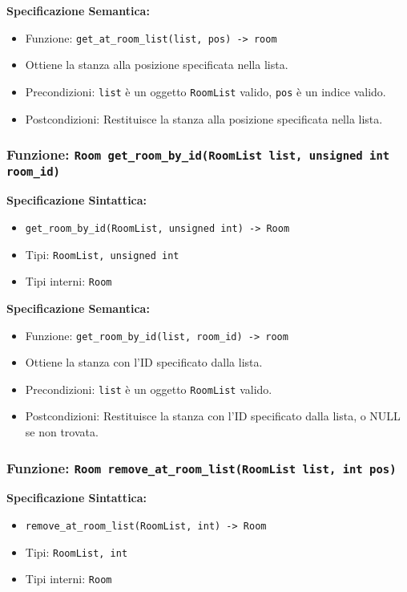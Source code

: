 \documentclass[11pt]{scrartcl} %
\begin{document}
\textbf{Specificazione Semantica:}
\begin{itemize}
\item Funzione: \texttt{get\_at\_room\_list(list, pos) -> room}
\item Ottiene la stanza alla posizione specificata nella lista.
\item Precondizioni: \texttt{list} è un oggetto \texttt{RoomList} valido, \texttt{pos} è un indice valido.
\item Postcondizioni: Restituisce la stanza alla posizione specificata nella lista.
\end{itemize}

\subsubsection{Funzione: \texttt{Room get\_room\_by\_id(RoomList list, unsigned int room\_id)}}

\textbf{Specificazione Sintattica:}
\begin{itemize}
\item \texttt{get\_room\_by\_id(RoomList, unsigned int) -> Room}
\item Tipi: \texttt{RoomList, unsigned int}
\item Tipi interni: \texttt{Room}
\end{itemize}

\textbf{Specificazione Semantica:}
\begin{itemize}
\item Funzione: \texttt{get\_room\_by\_id(list, room\_id) -> room}
\item Ottiene la stanza con l'ID specificato dalla lista.
\item Precondizioni: \texttt{list} è un oggetto \texttt{RoomList} valido.
\item Postcondizioni: Restituisce la stanza con l'ID specificato dalla lista, o NULL se non trovata.
\end{itemize}

\subsubsection{Funzione: \texttt{Room remove\_at\_room\_list(RoomList list, int pos)}}

\textbf{Specificazione Sintattica:}
\begin{itemize}
\item \texttt{remove\_at\_room\_list(RoomList, int) -> Room}
\item Tipi: \texttt{RoomList, int}
\item Tipi interni: \texttt{Room}
\end{itemize}
\end{document}
